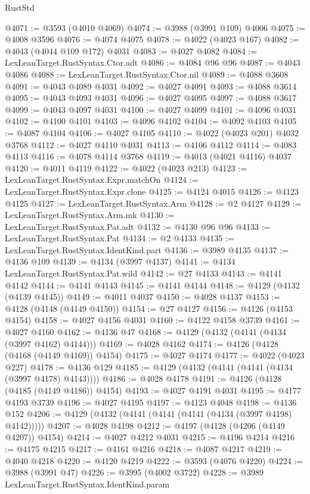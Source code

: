 \begin{lexlean}{RustStd}
\begin{coremodule}
@4071 := @3593 (@4010 @4069)
@4074 := @3988 (@3991 @109) @4006
@4075 := @4008 @3596
@4076 := @4074 @4075
@4078 := @4022 (@4023 @167)
@4082 := @4043 (@4044 @109 @172) @4031
@4083 := @4027 @4082
@4084 := LexLeanTarget.RustSyntax.Ctor.adt
@4086 := @4084 @96 @96
@4087 := @4043 @4086
@4088 := LexLeanTarget.RustSyntax.Ctor.nil
@4089 := @4088 @3608
@4091 := @4043 @4089 @4031
@4092 := @4027 @4091
@4093 := @4088 @3614
@4095 := @4043 @4093 @4031
@4096 := @4027 @4095
@4097 := @4088 @3617
@4099 := @4043 @4097 @4031
@4100 := @4027 @4099
@4101 := @4096 @4031
@4102 := @4100 @4101
@4103 := @4096 @4102
@4104 := @4092 @4103
@4105 := @4087 @4104
@4106 := @4027 @4105
@4110 := @4022 (@4023 @201) @4032 @3768
@4112 := @4027 @4110 @4031
@4113 := @4106 @4112
@4114 := @4083 @4113
@4116 := @4078 @4114 @3768
@4119 := @4013 (@4021 @4116) @4037
@4120 := @4011 @4119
@4122 := @4022 (@4023 @213)
@4123 := LexLeanTarget.RustSyntax.Expr.matchOn
@4124 := LexLeanTarget.RustSyntax.Expr.clone
@4125 := @4124 @4015
@4126 := @4123 @4125
@4127 := LexLeanTarget.RustSyntax.Arm
@4128 := @2 @4127
@4129 := LexLeanTarget.RustSyntax.Arm.mk
@4130 := LexLeanTarget.RustSyntax.Pat.adt
@4132 := @4130 @96 @96
@4133 := LexLeanTarget.RustSyntax.Pat
@4134 := @2 @4133
@4135 := LexLeanTarget.RustSyntax.IdentKind.part
@4136 := @3989 @4135
@4137 := @4136 @109
@4139 := @4134 (@3997 @4137)
@4141 := @4134 LexLeanTarget.RustSyntax.Pat.wild
@4142 := @27 @4133
@4143 := @4141 @4142
@4144 := @4141 @4143
@4145 := @4141 @4144
@4148 := @4129 (@4132 (@4139 @4145))
@4149 := @4011 @4037
@4150 := @4028 @4137
@4153 := @4128 (@4148 (@4149 @4150))
@4154 := @27 @4127
@4156 := @4126 (@4153 @4154)
@4158 := @4027 @4156 @4031
@4160 := @4122 @4158 @3739
@4161 := @4027 @4160
@4162 := @4136 @47
@4168 := @4129 (@4132 (@4141 (@4134 (@3997 @4162) @4144)))
@4169 := @4028 @4162
@4174 := @4126 (@4128 (@4168 (@4149 @4169)) @4154)
@4175 := @4027 @4174
@4177 := @4022 (@4023 @227)
@4178 := @4136 @129
@4185 := @4129 (@4132 (@4141 (@4141 (@4134 (@3997 @4178) @4143))))
@4186 := @4028 @4178
@4191 := @4126 (@4128 (@4185 (@4149 @4186)) @4154)
@4193 := @4027 @4191 @4031
@4195 := @4177 @4193 @3739
@4196 := @4027 @4195
@4197 := @4123 @4048
@4198 := @4136 @152
@4206 := @4129 (@4132 (@4141 (@4141 (@4141 (@4134 (@3997 @4198) @4142)))))
@4207 := @4028 @4198
@4212 := @4197 (@4128 (@4206 (@4149 @4207)) @4154)
@4214 := @4027 @4212 @4031
@4215 := @4196 @4214
@4216 := @4175 @4215
@4217 := @4161 @4216
@4218 := @4087 @4217
@4219 := @4040 @4218
@4220 := @4120 @4219
@4222 := @3593 (@4076 @4220)
@4224 := @3988 (@3991 @47)
@4226 := @3995 (@4002 @3722)
@4228 := @3989 LexLeanTarget.RustSyntax.IdentKind.param

\end{coremodule}
\end{lexlean}
